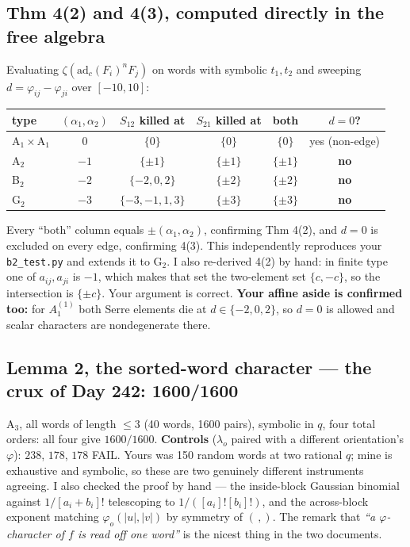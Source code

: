 \documentclass[11pt,a4paper]{article}
\newcommand{\adc}{\mathrm{ad}_c}
\begin{document}
\subsection{Thm 4(2) and 4(3), computed directly in the free algebra}
Evaluating $\zeta(\adc(F_i)^nF_j)$ on words with symbolic $t_1,t_2$ and sweeping
$d=\varphi_{ij}-\varphi_{ji}$ over $[-10,10]$:
\begin{center}\small
\begin{tabular}{@{}lccccc@{}}\toprule
type & $(\alpha_1,\alpha_2)$ & $S_{12}$ killed at & $S_{21}$ killed at & \textbf{both} & $d=0$?\\\midrule
A$_1\!\times\!$A$_1$ & $0$ & $\{0\}$ & $\{0\}$ & $\{0\}$ & yes (non-edge)\\
A$_2$ & $-1$ & $\{\pm1\}$ & $\{\pm1\}$ & $\{\pm1\}$ & \textbf{no}\\
B$_2$ & $-2$ & $\{-2,0,2\}$ & $\{\pm2\}$ & $\{\pm2\}$ & \textbf{no}\\
G$_2$ & $-3$ & $\{-3,-1,1,3\}$ & $\{\pm3\}$ & $\{\pm3\}$ & \textbf{no}\\\bottomrule
\end{tabular}
\end{center}
\noindent Every ``both'' column equals $\pm(\alpha_1,\alpha_2)$, confirming Thm 4(2), and $d=0$
is excluded on every edge, confirming 4(3). This independently reproduces your
\texttt{b2\_test.py} and extends it to G$_2$. I also re-derived 4(2) by hand: in finite type one of
$a_{ij},a_{ji}$ is $-1$, which makes that set the two-element set $\{c,-c\}$, so the intersection
is $\{\pm c\}$. Your argument is correct. \textbf{Your affine aside is confirmed too:} for
$A_1^{(1)}$ both Serre elements die at $d\in\{-2,0,2\}$, so $d=0$ is allowed and scalar characters
are nondegenerate there.

\subsection{Lemma 2, the sorted-word character --- the crux of Day 242: 1600/1600}
A$_3$, all words of length $\le3$ (40 words, 1600 pairs), symbolic in $q$, four total orders: all
four give $1600/1600$. \textbf{Controls} ($\lambda_o$ paired with a different orientation's
$\varphi$): $238$, $178$, $178$ FAIL. Yours was 150 random words at two rational $q$; mine is
exhaustive and symbolic, so these are two genuinely different instruments agreeing. I also checked
the proof by hand --- the inside-block Gaussian binomial against $1/[a_i{+}b_i]!$ telescoping to
$1/([a_i]![b_i]!)$, and the across-block exponent matching $\varphi_o(|u|,|v|)$ by symmetry of
$(\,,)$. The remark that \emph{``a $\varphi$-character of $f$ is read off one word''} is the nicest
thing in the two documents.
\end{document}
